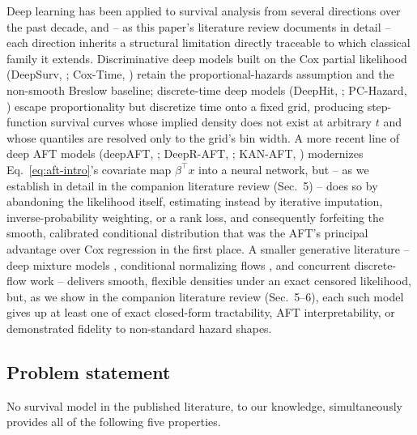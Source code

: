 \documentclass[11pt]{article}
\begin{document}
Deep learning has been applied to survival analysis from several
directions over the past decade, and -- as this paper's literature review
documents in detail -- each direction inherits a structural limitation
directly traceable to which classical family it extends. Discriminative
deep models built on the Cox partial likelihood (DeepSurv,
\citealp{katzman2018deepsurv}; Cox-Time, \citealp{kvamme2019coxtime})
retain the proportional-hazards assumption and the non-smooth Breslow
baseline; discrete-time deep models (DeepHit, \citealp{lee2018deephit};
PC-Hazard, \citealp{kvamme2021pchazard}) escape proportionality but
discretize time onto a fixed grid, producing step-function survival
curves whose implied density does not exist at arbitrary $t$ and whose
quantiles are resolved only to the grid's bin width. A more recent line
of deep AFT models (deepAFT, \citealp{norman2024deepaft}; DeepR-AFT,
\citealp{kim2022deepraft}; KAN-AFT, \citealp{francis2025kanaft})
modernizes Eq.~\eqref{eq:aft-intro}'s covariate map $\beta^\top x$ into a
neural network, but -- as we establish in detail in
the companion literature review (Sec.~5) -- does so by abandoning the
likelihood itself, estimating instead by iterative imputation,
inverse-probability weighting, or a rank loss, and consequently
forfeiting the smooth, calibrated conditional distribution that was the
AFT's principal advantage over Cox regression in the first place. A
smaller generative literature -- deep mixture models
\citep{nagpal2022dsm}, conditional normalizing flows
\citep{ausset2021flows}, and concurrent discrete-flow work
\citep{licai2026} -- delivers smooth, flexible densities under an exact
censored likelihood, but, as we show in the companion literature review
(Sec.~5--6), each such model
gives up at least one of exact closed-form tractability, AFT
interpretability, or demonstrated fidelity to non-standard hazard shapes.

\subsection{Problem statement}
\label{sec:problem}

No survival model in the published literature, to our knowledge,
simultaneously provides all of the following five properties.
\end{document}
